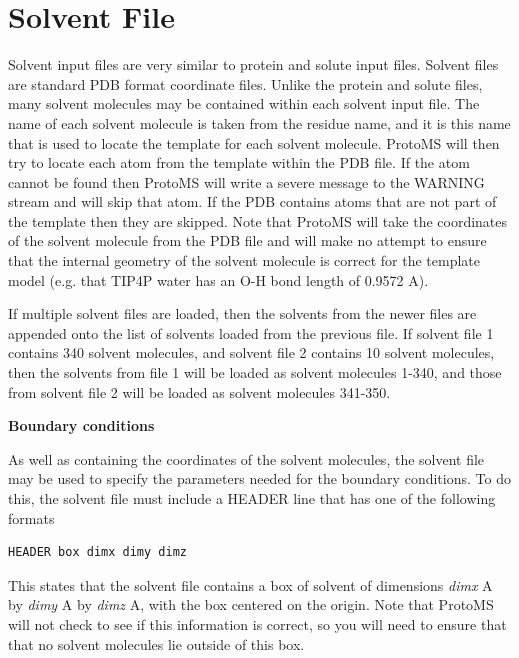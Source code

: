 \documentclass[letterpaper,10pt,english]{sphinxmanual}
\begin{document}
\section{Solvent File}
\label{protoms:solvent-file}\label{protoms:solventpdb}
Solvent input files are very similar to protein and solute input files. Solvent files are standard PDB format coordinate files. Unlike the protein and solute files, many solvent molecules may be contained within each solvent input file. The name of each solvent molecule is taken from the residue name, and it is this name that is used to locate the template for each solvent molecule. ProtoMS will then try to locate each atom from the template within the PDB file. If the atom cannot be found then ProtoMS will write a severe message to the WARNING stream and will skip that atom. If the PDB contains atoms that are not part of the template then they are skipped. Note that ProtoMS will take the coordinates of the solvent molecule from the PDB file and will make no attempt to ensure that the internal geometry of the solvent molecule is correct for the template model (e.g. that
TIP4P water has an O-H bond length of 0.9572 A).

If multiple solvent files are loaded, then the solvents from the newer files are appended onto the list of solvents loaded from the previous file. If solvent file 1 contains 340 solvent molecules, and solvent file 2 contains 10 solvent molecules, then the solvents from file 1 will be loaded as solvent molecules 1-340, and those from solvent file 2 will be loaded as solvent molecules 341-350.

\textbf{Boundary conditions}

As well as containing the coordinates of the solvent molecules, the solvent file may be used to specify the parameters needed for the boundary conditions. To do this, the solvent file must include a HEADER line that has one of the following formats

\begin{Verbatim}[commandchars=\\\{\}]
HEADER box dimx dimy dimz
\end{Verbatim}

This states that the solvent file contains a box of solvent of dimensions \emph{dimx} A by \emph{dimy} A by \emph{dimz} A, with the box centered on the origin. Note that ProtoMS will not check to see if this information is correct, so you will need to ensure that that no solvent molecules lie outside of this box.
\end{document}
